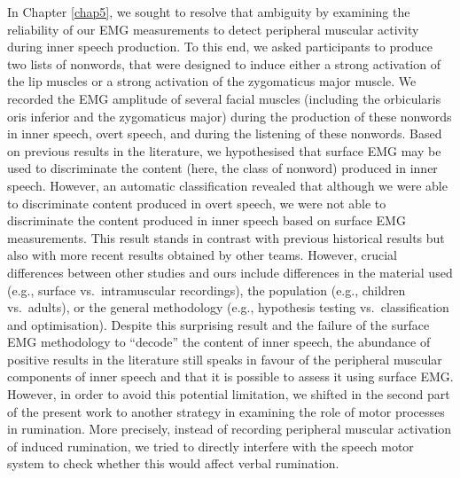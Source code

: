 \documentclass[a4paper,12pt,twoside,onecolumn,openright,final,oldfontcommands]{memoir}
\begin{document}
In Chapter \ref{chap5}, we sought to resolve that ambiguity by examining the reliability of our EMG measurements to detect peripheral muscular activity during inner speech production. To this end, we asked participants to produce two lists of nonwords, that were designed to induce either a strong activation of the lip muscles or a strong activation of the zygomaticus major muscle. We recorded the EMG amplitude of several facial muscles (including the orbicularis oris inferior and the zygomaticus major) during the production of these nonwords in inner speech, overt speech, and during the listening of these nonwords. Based on previous results in the literature, we hypothesised that surface EMG may be used to discriminate the content (here, the class of nonword) produced in inner speech. However, an automatic classification revealed that although we were able to discriminate content produced in overt speech, we were not able to discriminate the content produced in inner speech based on surface EMG measurements. This result stands in contrast with previous historical results but also with more recent results obtained by other teams. However, crucial differences between other studies and ours include differences in the material used (e.g., surface vs.~intramuscular recordings), the population (e.g., children vs.~adults), or the general methodology (e.g., hypothesis testing vs.~classification and optimisation). Despite this surprising result and the failure of the surface EMG methodology to \enquote{decode} the content of inner speech, the abundance of positive results in the literature still speaks in favour of the peripheral muscular components of inner speech and that it is possible to assess it using surface EMG. However, in order to avoid this potential limitation, we shifted in the second part of the present work to another strategy in examining the role of motor processes in rumination. More precisely, instead of recording peripheral muscular activation of induced rumination, we tried to directly interfere with the speech motor system to check whether this would affect verbal rumination.
\end{document}
